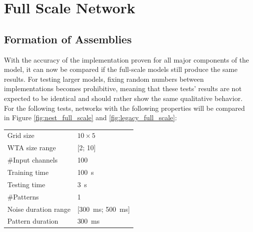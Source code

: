\section{Full Scale Network} \label{sec:full_scale}
\subsection{Formation of Assemblies}
With the accuracy of the implementation proven for all major components of the model, it can now be compared if the full-scale models still produce the same results. For testing larger models, fixing random numbers between implementations becomes prohibitive, meaning that these tests' results are not expected to be identical and should rather show the same qualitative behavior. For the following tests, networks with the following properties will be compared in Figure \ref{fig:nest_full_scale} and \ref{fig:legacy_full_scale}:\\
\begin{table}[h!]
\begin{tabular}{|ll}
Grid size            & $10\times 5$                                       \\
WTA size range       & [2; 10]                                            \\
\#Input channels     & 100                                                \\
Training time        & \SI{100}{\second}                                  \\
Testing time         & \SI{3}{\second}                                    \\
\#Patterns           & 1                                                  \\
Noise duration range & [\SI{300}{\milli\second}; \SI{500}{\milli\second}] \\
Pattern duration     & \SI{300}{\milli\second}                       
\end{tabular}
\end{table}

